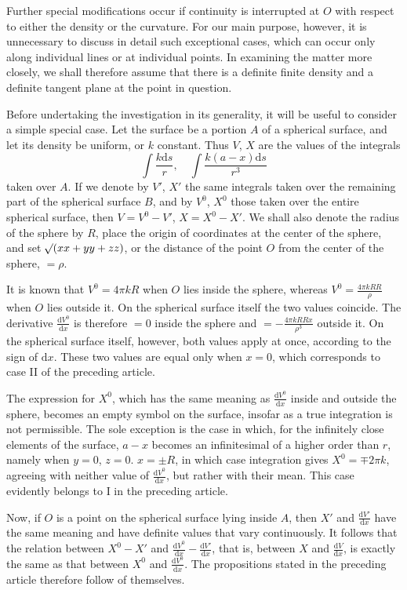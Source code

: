 Further special modifications occur if continuity is interrupted at $O$ with respect to either the density or the curvature. For our main purpose, however, it is unnecessary to discuss in detail such exceptional cases, which can occur only along individual lines or at individual points. In examining the matter more closely, we shall therefore assume that there is a definite finite density and a definite tangent plane at the point in question.

Before undertaking the investigation in its generality, it will be useful to consider a simple special case. Let the surface be a portion $A$ of a spherical surface, and let its density be uniform, or $k$ constant. Thus $V$, $X$ are the values of the integrals
%
\[
\int\frac{k\mathrm{d}s}{r},\quad\int\frac{k(a-x)\mathrm{d}s}{r^3}
\]
taken over $A$. If we denote by $V'$, $X'$ the same integrals taken over the remaining part of the spherical surface $B$, and by $V^0$, $X^0$ those taken over the entire spherical surface, then $V=V^0-V'$, $X=X^0-X'$. We shall also denote the radius of the sphere by $R$, place the origin of coordinates at the center of the sphere, and set $\mathord{{}^{}\!\surd}(xx+yy+zz)$, or the distance of the point $O$ from the center of the sphere, $=\rho$.

It is known that $V^0=4\pi kR$ when $O$ lies inside the sphere, whereas $V^0=\frac{4\pi kRR}{\rho}$ when $O$ lies outside it. On the spherical surface itself the two values coincide. The derivative $\frac{\mathrm{d}V^0}{\mathrm{d}x}$ is therefore $=0$ inside the sphere and $=-\frac{4\pi kRRx}{\rho^3}$ outside it. On the spherical surface itself, however, both values apply at once, according to the sign of $\mathrm{d}x$. These two values are equal only when $x=0$, which corresponds to case II of the preceding article.

The expression for $X^0$, which has the same meaning as $\frac{\mathrm{d}V^0}{\mathrm{d}x}$ inside and outside the sphere, becomes an empty symbol on the surface, insofar as a true integration is not permissible. The sole exception is the case in which, for the infinitely close elements of the surface, $a-x$ becomes an infinitesimal of a higher order than $r$, namely when $y=0$, $z=0$. $x=\pm R$, in which case integration gives $X^0=\mp2\pi k$, agreeing with neither value of $\frac{\mathrm{d}V^0}{\mathrm{d}x}$, but rather with their mean. This case evidently belongs to I in the preceding article.

Now, if $O$ is a point on the spherical surface lying inside $A$, then $X'$ and $\frac{\mathrm{d}V'}{\mathrm{d}x}$ have the same meaning and have definite values that vary continuously. It follows that the relation between $X^0-X'$ and $\frac{\mathrm{d}V^0}{\mathrm{d}x}-\frac{\mathrm{d}V'}{\mathrm{d}x}$, that is, between $X$ and $\frac{\mathrm{d}V}{\mathrm{d}x}$, is exactly the same as that between $X^0$ and $\frac{\mathrm{d}V^0}{\mathrm{d}x}$. The propositions stated in the preceding article therefore follow of themselves.

